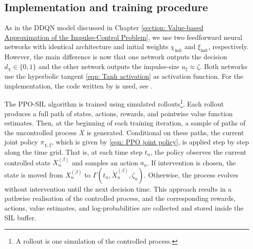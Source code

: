 \subsection{Implementation and training procedure}
As in the DDQN model discussed in Chapter \ref{section: Value-based Approximation of the Impulse-Control Problem}, we use two feedforward neural networks with identical architecture and initial weights $\chi_\text{init}$ and $\xi_\text{init}$, respectively. However, the main difference is now that one network outputs the decision $d_\chi \in \{0,1\}$ and the other network outputs the impulse-size $u_\xi \approx \zeta$. Both networks use the hyperbolic tangent \eqref{eqn: Tanh activation} as activation function. For the implementation, the code written by \textcite{jain2025impulse} is used, see \cite{jain2025impulsecode}.

The PPO-SIL algorithm is trained using simulated rollouts\footnote{A rollout is one simulation of the controlled process.}. Each rollout produces a full path of states, actions, rewards, and pointwise value function estimates. Then, at the beginning of each training iteration, a sample of paths of the uncontrolled process $X$ is generated. Conditional on these paths, the current joint policy $\pi_{\chi, \xi}$, which is given by \eqref{eqn: PPO joint policy}, is applied step by step along the time grid. That is, at each time step $t_n$, the policy observes the current controlled state $X_n^{(\beta)}$ and samples an action $a_n$. If intervention is chosen, the state is moved from $X_n^{(\beta)}$ to $\Gamma(t_n,\check{X}_n^{(\beta)},\zeta_n)$. Otherwise, the process evolves without intervention until the next decision time. This approach results in a pathwise realisation of the controlled process, and the corresponding rewards, actions, value estimates, and log-probabilities are collected and stored inside the SIL buffer.

